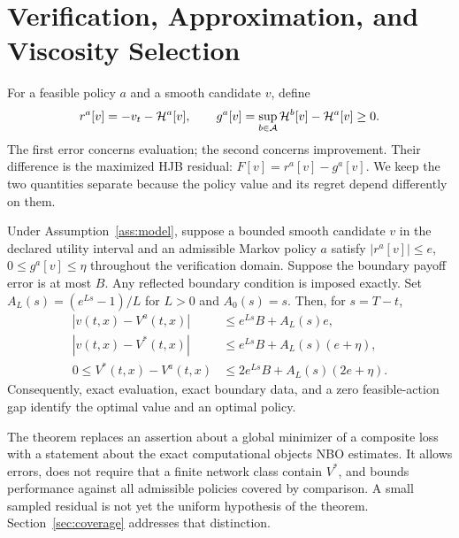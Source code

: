 \section{Verification, Approximation, and Viscosity Selection}\label{sec:theory}
For a feasible policy $a$ and a smooth candidate $v$, define
\begin{equation}\label{eq:errors}
 r^a[v]=-v_t-\mathcal H^a[v],\qquad
 g^a[v]=\sup_{b\in\mathcal A}\mathcal H^b[v]-\mathcal H^a[v]\geq0.
\end{equation}
The first error concerns evaluation; the second concerns improvement. Their difference is the maximized HJB residual: $F[v]=r^a[v]-g^a[v]$. We keep the two quantities separate because the policy value and its regret depend differently on them.

\begin{theorem}\label{thm:verification}
Under Assumption~\ref{ass:model}, suppose a bounded smooth candidate $v$ in the declared utility interval and an admissible Markov policy $a$ satisfy $|r^a[v]|\leq e$, $0\leq g^a[v]\leq\eta$ throughout the verification domain. Suppose the boundary payoff error is at most $B$. Any reflected boundary condition is imposed exactly. Set $A_L(s)=(e^{Ls}-1)/L$ for $L>0$ and $A_0(s)=s$. Then, for $s=T-t$,
\begin{align}
 |v(t,x)-V^a(t,x)|&\leq e^{Ls}B+A_L(s)e,\label{eq:policybound}\\
 |v(t,x)-V^*(t,x)|&\leq e^{Ls}B+A_L(s)(e+\eta),\label{eq:valuebound}\\
 0\leq V^*(t,x)-V^a(t,x)&\leq2e^{Ls}B+A_L(s)(2e+\eta).\label{eq:regret}
\end{align}
Consequently, exact evaluation, exact boundary data, and a zero feasible-action gap identify the optimal value and an optimal policy.
\end{theorem}

The theorem replaces an assertion about a global minimizer of a composite loss with a statement about the exact computational objects NBO estimates. It allows errors, does not require that a finite network class contain $V^*$, and bounds performance against all admissible policies covered by comparison. A small sampled residual is not yet the uniform hypothesis of the theorem. Section~\ref{sec:coverage} addresses that distinction.

